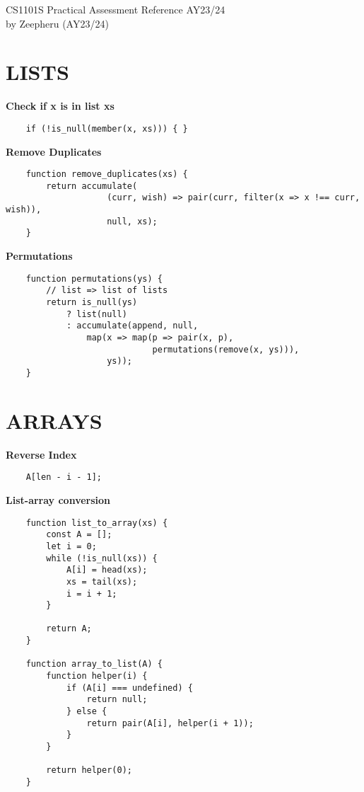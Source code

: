 \documentclass[a4paper]{article} \usepackage[backend=biber, style=numeric, sorting=none]{biblatex}
\begin{document}
\setlength\parindent{0pt} %




\begin{center}
{\large CS1101S Practical Assessment Reference AY23/24}\\{by Zeepheru (AY23/24)}
\end{center}
\hrulefill



\section*{LISTS}

\textbf{Check if x is in list xs}
\begin{verbatim}
    if (!is_null(member(x, xs))) { }
\end{verbatim}

\textbf{Remove Duplicates}
\begin{verbatim}
    function remove_duplicates(xs) {
        return accumulate(
                    (curr, wish) => pair(curr, filter(x => x !== curr, wish)),
                    null, xs);
    }
\end{verbatim}

\textbf{Permutations}
\begin{verbatim}
    function permutations(ys) {
        // list => list of lists
        return is_null(ys)
            ? list(null)
            : accumulate(append, null,
                map(x => map(p => pair(x, p),
                             permutations(remove(x, ys))),
                    ys));
    }
\end{verbatim}

\hrulefill

\section*{ARRAYS}

\textbf{Reverse Index}
\begin{verbatim}
    A[len - i - 1];
\end{verbatim}

\textbf{List-array conversion}
\begin{verbatim}
    function list_to_array(xs) {
        const A = [];
        let i = 0;
        while (!is_null(xs)) {
            A[i] = head(xs);
            xs = tail(xs);
            i = i + 1;
        }
        
        return A;
    }
    
    function array_to_list(A) {
        function helper(i) {
            if (A[i] === undefined) {
                return null;
            } else {
                return pair(A[i], helper(i + 1));
            }
        }
        
        return helper(0);
    }
\end{verbatim}
\end{document}
